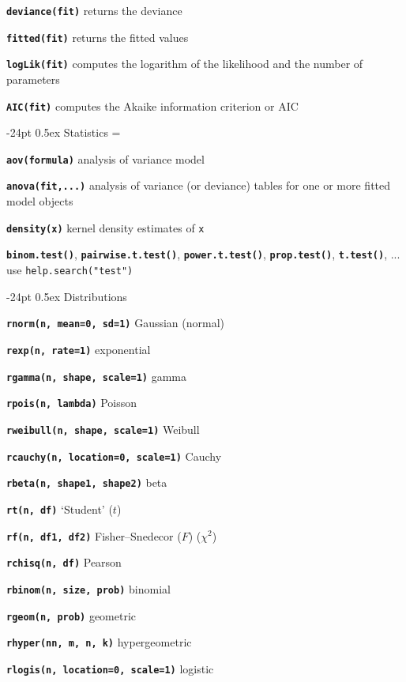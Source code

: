 \documentclass[10pt,landscape]{article}
\makeatletter
\renewcommand\section{\@startsection{section}{1}{0mm}%
                                     {-24pt}%
                                     {0.5ex}%
                                {\color{blue}\normalfont\large\bfseries}}
\newcommand{\code}{\texttt}
\newcommand{\bcode}[1]{\texttt{\textbf{#1}}}
\makeatother
\begin{document}
\begin{multicols}{3}
\bcode{deviance(fit)}  returns the deviance

\bcode{fitted(fit)}  returns the fitted values

\bcode{logLik(fit)}  computes the logarithm of the likelihood and the number of parameters

\bcode{AIC(fit)}  computes the Akaike information criterion or AIC


\section{Statistics}
\everypar={\hangindent=9mm}

\bcode{aov(formula)} analysis of variance model

\bcode{anova(fit,...)} analysis of variance (or deviance) tables for one or more
     fitted model objects

\bcode{density(x)} kernel density estimates of \code{x}

\bcode{binom.test()}, \bcode{pairwise.t.test()}, \bcode{power.t.test()},
\bcode{prop.test()}, \bcode{t.test()}, ... use
\code{help.search("test")} 





\section{Distributions}

\bcode{rnorm(n, mean=0, sd=1)} Gaussian (normal)  

\bcode{rexp(n, rate=1)} exponential

\bcode{rgamma(n, shape, scale=1)} gamma  

\bcode{rpois(n, lambda)} Poisson

\bcode{rweibull(n, shape, scale=1)} Weibull

\bcode{rcauchy(n, location=0, scale=1)} Cauchy  

\bcode{rbeta(n, shape1, shape2)} beta

\bcode{rt(n, df)} `Student' ($t$)  

\bcode{rf(n, df1, df2)} Fisher--Snedecor ($F$)  ($\chi^2$)  

\bcode{rchisq(n, df)} Pearson 

\bcode{rbinom(n, size, prob)} binomial  

\bcode{rgeom(n, prob)} geometric  

\bcode{rhyper(nn, m, n, k)} hypergeometric  

\bcode{rlogis(n, location=0, scale=1)} logistic  


\end{multicols}
\end{document}
